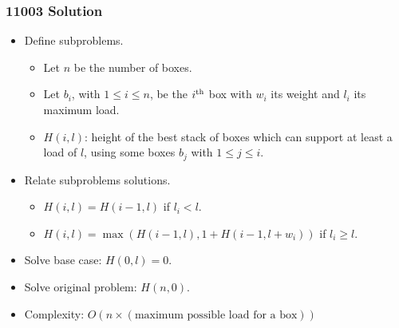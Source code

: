 \documentclass{beamer}
\begin{document}
\begin{frame}%
\frametitle{11003 Solution}

\footnotesize

\begin{itemize}

\item Define subproblems.
\begin{itemize}
\footnotesize
\item<1-> Let $n$ be the number of boxes.
\vspace{0.1cm}
\item<2-> Let $b_i$, with $1 \le i \le n$, be the $i^{\rm th}$ box with $w_i$ its weight and $l_i$ its maximum load.
\vspace{0.1cm}
\item<3-> $H(i, l)$: height of the best stack of boxes which can support at least a load of $l$, using some boxes $b_j$ with $1 \le j \le i$.
\end{itemize}

\vspace{0.2cm}

\item<4-> Relate subproblems solutions.
\begin{itemize}
\footnotesize
\item<4-> $H(i, l) = H(i - 1, l)$ if $l_i < l$.
\vspace{0.1cm}
\item<5-> $H(i, l) = \max(H(i - 1, l), 1 + H(i - 1, l + w_i))$ if $l_i \ge l$.
\end{itemize}

\vspace{0.2cm}

\item<6-> Solve base case: $H(0, l) = 0$.

\vspace{0.2cm}

\item<7-> Solve original problem: $H(n, 0)$.

\vspace{0.2cm}

\item<8-> Complexity: $O(n\times(\textrm{maximum possible load for a box}))$


\end{itemize}

\end{frame}
\end{document}
